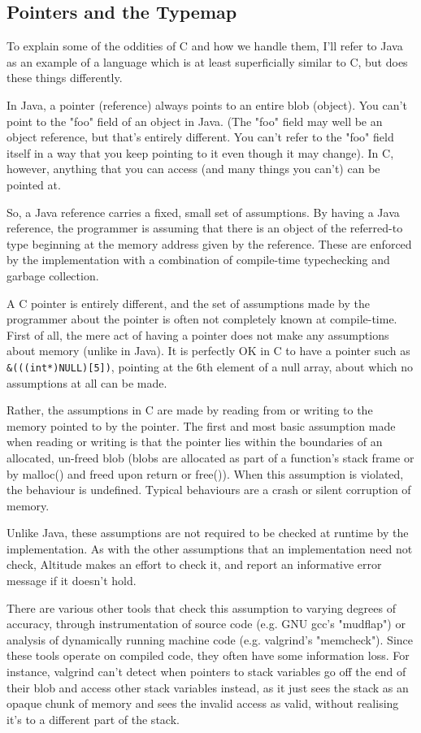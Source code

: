 \documentclass[10pt,a4paper]{report}
\begin{document}
\subsection{Pointers and the Typemap}

To explain some of the oddities of C and how we handle them, I'll refer to Java as an example of a language which is at least superficially similar to C, but does these things differently.

In Java, a pointer (reference) always points to an entire blob (object). You can't point to the "foo" field of an object in Java. (The "foo" field may well be an object reference, but that's entirely different. You can't refer to the "foo" field itself in a way that you keep pointing to it even though it may change). In C, however, anything that you can access (and many things you can't) can be pointed at.

So, a Java reference carries a fixed, small set of assumptions. By having a Java reference, the programmer is assuming that there is an object of the referred-to type beginning at the memory address given by the reference. These are enforced by the implementation with a combination of compile-time typechecking and garbage collection.

A C pointer is entirely different, and the set of assumptions made by the programmer about the pointer is often not completely known at compile-time. First of all, the mere act of having a pointer does not make any assumptions about memory (unlike in Java). It is perfectly OK in C to have a pointer such as \lstinline{&(((int*)NULL)[5])}, pointing at the 6th element of a null array, about which no assumptions at all can be made.

Rather, the assumptions in C are made by reading from or writing to the memory pointed to by the pointer. The first and most basic assumption made when reading or writing is that the pointer lies within the boundaries of an allocated, un-freed blob (blobs are allocated as part of a function's stack frame or by malloc() and freed upon return or free()). When this assumption is violated, the behaviour is undefined. Typical behaviours are a crash or silent corruption of memory.

Unlike Java, these assumptions are not required to be checked at runtime by the implementation. As with the other assumptions that an implementation need not check, Altitude makes an effort to check it, and report an informative error message if it doesn't hold.

There are various other tools that check this assumption to varying degrees of accuracy, through instrumentation of source code (e.g. GNU gcc's "mudflap") or analysis of dynamically running machine code (e.g. valgrind's "memcheck"). Since these tools operate on compiled code, they often have some information loss. For instance, valgrind can't detect when pointers to stack variables go off the end of their blob and access other stack variables instead, as it just sees the stack as an opaque chunk of memory and sees the invalid access as valid, without realising it's to a different part of the stack.
\end{document}

